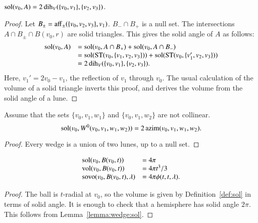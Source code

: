 \begin{lemma}  $\operatorname{sol}(v_0,A) = 2\operatorname{dih}_V(\{v_0,v_1\},\{v_2,v_3\})$.
\end{lemma}

\begin{proof}
Let $B_{\pm} = {\operatorname{aff}}_\pm(\{v_0,v_2,v_3\},v_1)$.  $B_- \cap B_+$
is a null set.  The intersections $A\cap B_{\pm}\cap B(v_0,r)$ 
are solid triangles.  This gives the solid angle of $A$ as
follows:
   $$\begin{array}{lll}
   \operatorname{sol}(v_0,A) &= \operatorname{sol}(v_0,A\cap B_+)+\operatorname{sol}(v_0,A\cap B_-) \\
   &= 
   \operatorname{sol}({\operatorname{ST}}(v_0,\{v_1,v_2,v_3\})) + \operatorname{sol}({\operatorname{ST}}(v_0,\{v_1',v_2,v_3\})) \\
   &=
   2\operatorname{dih}_V(\{v_0,v_1\},\{v_2,v_3\}).
   \end{array}
   $$
Here,  $v_1'= 2 v_0 - v_1$, the reflection of $v_1$
through $v_0$.  The usual calculation of the volume of a solid triangle
inverts this proof, 
and derives the volume from the solid angle of a lune.
\end{proof}



\begin{lemma} 
Assume that the sets $\{v_0,v_1,w_1\}$ and
$\{v_0,v_1,w_2\}$ are not collinear. 
$$\operatorname{sol}(v_0,W^0(v_0,v_1,w_1,w_2)) = 2\,{\operatorname{azim}}(v_0,v_1,w_1,w_2).$$
%
\end{lemma}    

\begin{proof} Every wedge is a union of two lunes, up to a null set.
\end{proof}

\begin{lemma}  
   $$
   \begin{array}{lll}
    {\operatorname{sol}}(v_0,B(v_0,t)) &= 4\pi\\
    {\operatorname{vol}}(v_0,B(v_0,t)) &= 4\pi t^3/3\\
    {\operatorname{sovo}}(v_0,B(v_0,t),\lambda) &= 4 \pi \phi(t,t,\lambda).
   \end{array}
   $$
\end{lemma}

\begin{proof}
The ball is $t$-radial at $v_0$, so the volume is given by
Definition~\ref{def:sol} in terms of solid angle.  It is enough
to check that a hemisphere has solid angle $2\pi$.  This follows
from Lemma~\ref{lemma:wedge:sol}.
\end{proof}  




